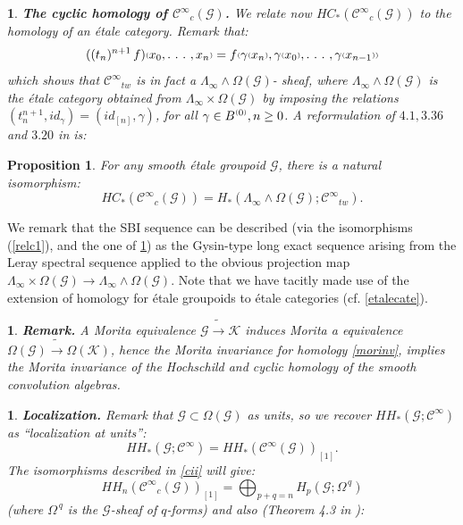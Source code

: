 \documentclass[a4paper]{article}
\newtheorem{prop}[st]{Proposition}
\newtheorem{num}[st]{}
\newcommand{\rmap}{\longrightarrow}
\newcommand{\Ka}{\ensuremath{\mathcal{K}}}
\newcommand{\G}{\ensuremath{\mathcal{G}}}
\newcommand{\C}{\ensuremath{\mathcal{C}}}
\newcommand{\cii}{\ensuremath{\C^{\infty}}}
\newcommand{\ps}{{\raise 1pt\hbox{\tiny (}}}
\newcommand{\pd}{{\raise 1pt\hbox{\tiny )}}}
\newcommand{\nB}[1]{\ensuremath{B^{\ps #1\pd}}}
\begin{document}
\begin{num}
\emph{
{\bf The cyclic homology of $\cii_c(\G)$.} We relate now $HC_{*}(\cii_c(\G))$ to the homology of an \'etale category. Remark that:
\begin{equation}
\label{relc2}
((t_n)^{n+ 1}\, f)\ps x_0, .\ .\ .\ , x_n\pd = f\ps \gamma\ps x_n\pd , \gamma\ps x_0\pd , .\ .\ .\ , \gamma\ps x_{n- 1}\pd\pd
\end{equation}
which shows that $\cii_{tw}$ is in fact a $\Lambda_{\infty}\wedge \Omega(\G)$- sheaf, where $\Lambda_{\infty}\wedge \Omega(\G)$ is the \'etale category obtained from $\Lambda_{\infty}\times\Omega(\G)$ by imposing the relations $(t_n^{n+ 1}, id_{\gamma}) = (id_{[n]}, \gamma)$, for all $\gamma \in \nB{0}, n \geq 0$. A reformulation of $4.1, 3.36$ and $3.20$ in \cite{Cra} is:
}
\end{num}

\begin{prop} 
\label{relc3} For any smooth \'etale groupoid $\G$, there is a natural isomorphism:
\[ HC_{*}(\cii_c(\G)) = H_{*}(\Lambda_{\infty}\wedge \Omega(\G); \cii_{tw}) .\]
\end{prop}

We remark that the SBI sequence can be described (via the isomorphisms (\ref{relc1}), and the one of \ref{relc3}) as the Gysin-type long exact sequence arising from the Leray spectral sequence applied to the obvious projection map $\Lambda_{\infty} \times\Omega(\G) \rmap \Lambda_{\infty}\wedge \Omega(\G)$. Note that we have tacitly made use of the extension of homology for \'etale groupoids to \'etale categories (cf. \ref{etalecate}).

\begin{num}
\label{rkk}
\emph{
{\bf Remark.} A Morita equivalence $\G \tilde{\rmap} \Ka$ induces Morita a equivalence $\Omega(\G) \tilde{\rmap} \Omega({\Ka})$, hence the Morita invariance for homology \ref{morinv}, implies the Morita invariance of the Hochschild and cyclic homology of the smooth convolution algebras.
}
\end{num}


\begin{num}
\emph{
{\bf Localization.} Remark that $\G \subset \Omega(\G)$ as units, so we recover $HH_{*}(\G; \cii)$ as ``localization at units'':
\[ HH_{*}(\G; \cii) = HH_{*}(\cii(\G))_{[1]} .\]
The isomorphisms described in \ref{cii} will give:
\[ HH_n(\cii_c(\G))_{[1]} = \bigoplus_{p+ q= n} H_{p}(\G; \Omega^{\,q}) \]
(where $\Omega^{\,q}$ is the $\G$-sheaf of $q$-forms) and also (Theorem 4.3 in \cite{Cra}):
}
\end{num}
\end{document}
